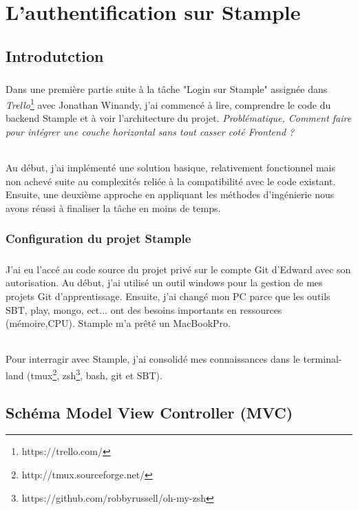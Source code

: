 \chapter{L'authentification sur Stample}
\section*{}
\section{Introdutction}
\paragraph{}
Dans une première partie suite à la tâche "Login sur Stample" assignée dans \textit{Trello}\footnote{https://trello.com/} avec Jonathan Winandy, j'ai commencé à lire, comprendre le code du backend Stample et à voir l'architecture du projet. 
\newline
\textit{Problématique, Comment faire pour intégrer une couche horizontal sans tout casser coté Frontend ?}
\subparagraph{}
Au début, j'ai implémenté une solution basique, relativement fonctionnel mais non achevé suite au complexités reliée à la compatibilité avec le code existant.
Ensuite, une deuxième approche en appliquant les méthodes d'ingénierie nous avons réussi à finaliser la tâche en moins de temps.

\subsection{Configuration du projet Stample}
\paragraph{}
J'ai eu l'accé au code source du projet privé sur le compte Git d'Edward avec son autorisation.
Au début, j'ai utilisé un outil windows pour la gestion de mes projets Git d'apprentissage.
Ensuite, j'ai changé mon PC parce que les outils SBT, play, mongo, ect... ont des besoins importants en ressources (mémoire,CPU). Stample m'a prêté un MacBookPro. 
\subparagraph{}
Pour interragir avec Stample, j'ai consolidé mes connaissances dans le terminal-land (tmux\footnote{http://tmux.sourceforge.net/}, zsh\footnote{https://github.com/robbyrussell/oh-my-zsh}, bash, git et SBT).
\section{Schéma Model View Controller (MVC)}
